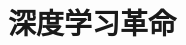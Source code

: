 \documentclass[../main.tex]{subfiles}
\begin{document}
\chapter{深度学习革命}\label{chapter:ch01-深度学习革命}




\end{document}
